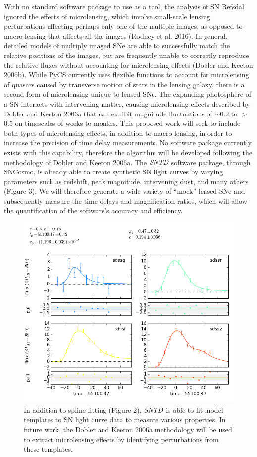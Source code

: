 With no standard software package to use as a tool, the analysis of
SN Refsdal ignored the effects of microlensing, which involve
small-scale lensing perturbations affecting perhaps only one of the
multiple images, as opposed to macro lensing that affects all the
images (Rodney et al. 2016). In general, detailed models of multiply
imaged SNe are able to successfully match the relative positions of
the images, but are frequently unable to correctly reproduce the
relative fluxes without accounting for microlensing effects (Dobler
and Keeton 2006b). While PyCS currently uses flexible functions to
account for microlensing of quasars caused by transverse motion of
stars in the lensing galaxy, there is a second form of microlensing
unique to lensed SNe. The expanding photosphere of a SN interacts with
intervening matter, causing microlensing effects described by Dobler
and Keeton 2006a that can exhibit magnitude fluctuations of $\sim$0.2
to $>$0.5 on timescales of weeks to months. This proposed work will
seek to include both types of microlensing effects, in addition to
macro lensing, in order to increase the precision of time delay
measurements. No software package currently exists with this
capability, therefore the algorithm will be developed following the
methodology of Dobler and Keeton 2006a. 
The $\textit{SNTD}$ software
package, through SNCosmo, is already able to create synthetic SN light
curves by varying parameters such as redshift, peak magnitude,
intervening dust, and many others (Figure 3). We will therefore
generate a wide variety of ``mock'' lensed SNe and subsequently
measure the time delays and magnification ratios, which will allow the
quantification of the software's accuracy and efficiency.

\begin{figure}[h]
\centering
\includegraphics[scale=.4]{sncosmo.png}
\caption{
In addition to spline fitting (Figure 2), $\textit{SNTD}$ is able to
fit model templates to SN light curve data to measure various
properties. In future work, the Dobler and Keeton 2006a methodology
will be used to extract microlensing effects by identifying
perturbations from these templates.}
\end{figure}

